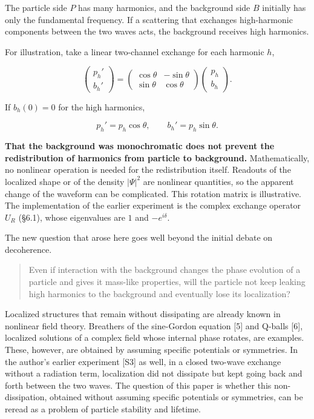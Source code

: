\documentclass[
  a4paper,
]{article}
\begin{document}
The particle side \(P\) has many harmonics, and the background side
\(B\) initially has only the fundamental frequency. If a scattering that
exchanges high-harmonic components between the two waves acts, the
background receives high harmonics.

For illustration, take a linear two-channel exchange for each harmonic
\(h\),

\[
\begin{pmatrix}p_h'\\b_h'\end{pmatrix}
=
\begin{pmatrix}
\cos\theta&-\sin\theta\\
\sin\theta&\cos\theta
\end{pmatrix}
\begin{pmatrix}p_h\\b_h\end{pmatrix}.
\]

If \(b_h(0)=0\) for the high harmonics,

\[
p_h' =p_h\cos\theta,\qquad
b_h'=p_h\sin\theta.
\]

\textbf{That the background was monochromatic does not prevent the
redistribution of harmonics from particle to background.}
Mathematically, no nonlinear operation is needed for the redistribution
itself. Readouts of the localized shape or of the density \(|\Psi|^2\)
are nonlinear quantities, so the apparent change of the waveform can be
complicated. This rotation matrix is illustrative. The implementation of
the earlier experiment is the complex exchange operator \(U_R\) (§6.1),
whose eigenvalues are \(1\) and \(-e^{i\delta}\).

The new question that arose here goes well beyond the initial debate on
decoherence.

\begin{quote}
Even if interaction with the background changes the phase evolution of a
particle and gives it mass-like properties, will the particle not keep
leaking high harmonics to the background and eventually lose its
localization?
\end{quote}

Localized structures that remain without dissipating are already known
in nonlinear field theory. Breathers of the sine-Gordon equation {[}5{]}
and Q-balls {[}6{]}, localized solutions of a complex field whose
internal phase rotates, are examples. These, however, are obtained by
assuming specific potentials or symmetries. In the author's earlier
experiment {[}S3{]} as well, in a closed two-wave exchange without a
radiation term, localization did not dissipate but kept going back and
forth between the two waves. The question of this paper is whether this
non-dissipation, obtained without assuming specific potentials or
symmetries, can be reread as a problem of particle stability and
lifetime.
\end{document}
